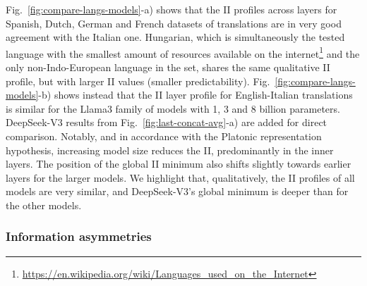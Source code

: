 \documentclass[10pt]{article} %
\begin{document}
Fig.~\ref{fig:compare-langs-models}-a) shows that the II profiles across layers for Spanish, Dutch, German and French datasets of translations are in very good agreement with the Italian one. Hungarian, which is simultaneously the tested language with the smallest amount of resources available on the internet\footnote{\url{https://en.wikipedia.org/wiki/Languages_used_on_the_Internet}} and the only non-Indo-European language in the set, shares the same qualitative II profile, but with  larger II values (smaller predictability). 
%
Fig.~\ref{fig:compare-langs-models}-b) shows instead that the II layer profile for English-Italian translations is similar for the Llama3 family of models with 1, 3 and 8 billion parameters. DeepSeek-V3 results from Fig.~\ref{fig:last-concat-avg}-a) are added for direct comparison. Notably, and in accordance with the Platonic representation hypothesis, increasing model size reduces the II, predominantly in the inner layers. The position of the global II minimum also shifts slightly towards earlier layers for the larger models. We highlight that, qualitatively, the II profiles of all models are very similar, and DeepSeek-V3's global minimum is deeper than for the other models. 



\subsubsection{Information asymmetries}
\label{sec:inf-asym}
\end{document}
